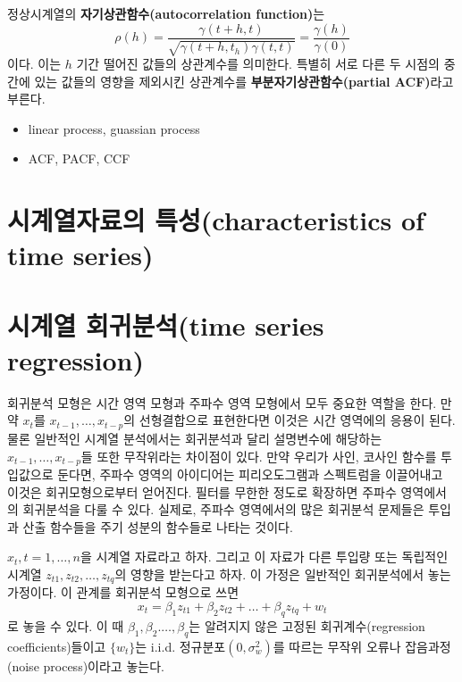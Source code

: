 \documentclass[b5paper,]{scrbook}
\theoremstyle{plain}
\theoremstyle{definition}
\numberwithin{equation}{section}
\let\BeginKnitrBlock\begin \let\EndKnitrBlock\end
\begin{document}
\BeginKnitrBlock{definition}[자기상관함수]
\protect\hypertarget{def:unnamed-chunk-216}{}{\label{def:unnamed-chunk-216} {} }정상시계열의 \textbf{자기상관함수(autocorrelation function)}는
\[\rho(h)=\frac{\gamma(t+h,t)}{\sqrt{\gamma(t+h,t_h)\gamma(t,t)}}=\frac{\gamma(h)}{\gamma(0)}\]
이다. 이는 \(h\) 기간 떨어진 값들의 상관계수를 의미한다. 특별히 서로 다른 두 시점의 중간에 있는 값들의 영향을 제외시킨 상관계수를 \textbf{부분자기상관함수(partial ACF)}라고 부른다.
\EndKnitrBlock{definition}

\begin{itemize}
\item
  linear process, guassian process
\item
  ACF, PACF, CCF
\end{itemize}

\hypertarget{-characteristics-of-time-series}{%
\section{시계열자료의 특성(characteristics of time series)}\label{-characteristics-of-time-series}}

\hypertarget{-time-series-regression}{%
\section{시계열 회귀분석(time series regression)}\label{-time-series-regression}}

회귀분석 모형은 시간 영역 모형과 주파수 영역 모형에서 모두 중요한 역할을 한다. 만약 \(x_{t}\)를 \(x_{t-1}, \ldots, x_{t-p}\)의 선형결합으로 표현한다면 이것은 시간 영역에의 응용이 된다. 물론 일반적인 시계열 분석에서는 회귀분석과 달리 설명변수에 해당하는 \(x_{t-1}, \ldots, x_{t-p}\)들 또한 무작위라는 차이점이 있다.
만약 우리가 사인, 코사인 함수를 투입값으로 둔다면, 주파수 영역의 아이디어는 피리오도그램과 스펙트럼을 이끌어내고 이것은 회귀모형으로부터 얻어진다. 필터를 무한한 정도로 확장하면 주파수 영역에서의 회귀분석을 다룰 수 있다. 실제로, 주파수 영역에서의 많은 회귀분석 문제들은 투입과 산출 함수들을 주기 성분의 함수들로 나타는 것이다.

\(x_{t},t=1,\ldots ,n\)을 시계열 자료라고 하자. 그리고 이 자료가 다른 투입량 또는 독립적인 시계열 \(z_{t1}, z_{t2}, \ldots ,z_{tq}\)의 영향을 받는다고 하자. 이 가정은 일반적인 회귀분석에서 놓는 가정이다. 이 관계를 회귀분석 모형으로 쓰면
\begin{equation}
x_{t}=\beta_{1}z_{t1}+\beta_{2}z_{t2}+\ldots + \beta_{q}z_{tq}+w_{t}
\label{eq:tsreg}
\end{equation}
로 놓을 수 있다. 이 때 \(\beta_{1},\beta_{2}.\ldots , \beta_{q}\)는 알려지지 않은 고정된 회귀계수(regression coefficients)들이고 \(\{ w_{t}\}\)는 i.i.d. 정규분포\((0,\sigma_{w}^{2})\)를 따르는 무작위 오류나 잡음과정(noise process)이라고 놓는다.
\end{document}
